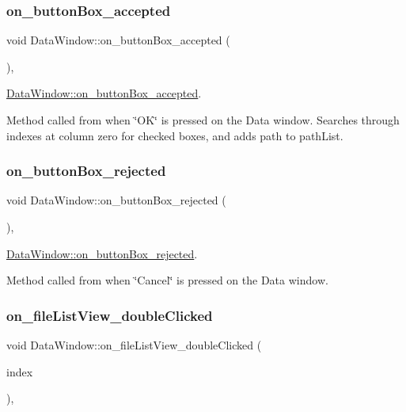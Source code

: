 \subsubsection{\texorpdfstring{on\+\_\+button\+Box\+\_\+accepted}{on\_buttonBox\_accepted}}
{\footnotesize\ttfamily void Data\+Window\+::on\+\_\+button\+Box\+\_\+accepted (\begin{DoxyParamCaption}{ }\end{DoxyParamCaption})\hspace{0.3cm}{\ttfamily [private]}, {\ttfamily [slot]}}



\hyperlink{class_data_window_ad87fafdcacd55f6edf71b61bcafc2a2d}{Data\+Window\+::on\+\_\+button\+Box\+\_\+accepted}. 

Method called from when \char`\"{}\+O\+K\char`\"{} is pressed on the Data window. Searches through indexes at column zero for checked boxes, and adds path to path\+List. \mbox{\label{class_data_window_a04f666600237b8807b990a274688fcca}} 
\subsubsection{\texorpdfstring{on\+\_\+button\+Box\+\_\+rejected}{on\_buttonBox\_rejected}}
{\footnotesize\ttfamily void Data\+Window\+::on\+\_\+button\+Box\+\_\+rejected (\begin{DoxyParamCaption}{ }\end{DoxyParamCaption})\hspace{0.3cm}{\ttfamily [private]}, {\ttfamily [slot]}}



\hyperlink{class_data_window_a04f666600237b8807b990a274688fcca}{Data\+Window\+::on\+\_\+button\+Box\+\_\+rejected}. 

Method called from when \char`\"{}\+Cancel\char`\"{} is pressed on the Data window. \mbox{\label{class_data_window_a23c96a1aa6f3c58cc8cc1eb9fe0535a7}} 
\subsubsection{\texorpdfstring{on\+\_\+file\+List\+View\+\_\+double\+Clicked}{on\_fileListView\_doubleClicked}}
{\footnotesize\ttfamily void Data\+Window\+::on\+\_\+file\+List\+View\+\_\+double\+Clicked (\begin{DoxyParamCaption}\item[{const Q\+Model\+Index \&}]{index }\end{DoxyParamCaption})\hspace{0.3cm}{\ttfamily [private]}, {\ttfamily [slot]}}



